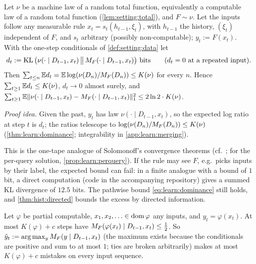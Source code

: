 \begin{theorem}[merging]\label{thm:learn:merging}
Let $\nu$ be a machine law of a random total function, equivalently a computable law of a random total function (\cref{lem:setting:total}), and $F\sim\nu$. Let the inputs follow any measurable rule $x_t=s_t(h_{t-1},\xi_t)$, with $h_{t-1}$ the history, $(\xi_t)$ independent of $F$, and $s_t$ arbitrary (possibly non-computable); $y_t:=F(x_t)$. With the one-step conditionals of \cref{def:setting:data} let
\[ d_t:=\KL\big(\nu(\cdot\mid D_{t-1},x_t)\,\big\|\,\MF(\cdot\mid D_{t-1},x_t)\big)\ \text{bits}\qquad(d_t=0\text{ at a repeated input}). \]
Then $\sum_{t\le n}\mathbb{E} d_t=\mathbb{E}\log(\nu(D_n)/M_{F}(D_n))\le K(\nu)$ for every $n$. Hence $\sum_{t\ge1}\mathbb{E} d_t\le K(\nu)$, $d_t\to0$ almost surely, and $\sum_{t\ge1}\mathbb{E}\|\nu(\cdot\mid D_{t-1},x_t)-M_{F}(\cdot\mid D_{t-1},x_t)\|_1^2\le2\ln2\cdot K(\nu)$.
\end{theorem}

\emph{Proof idea.} Given the past, $y_t$ has law $\nu(\cdot\mid D_{t-1},x_t)$, so the expected log ratio at step $t$ is $d_t$; the ratios telescope to $\log(\nu(D_n)/M_{F}(D_n))\le K(\nu)$ (\cref{thm:learn:dominance}; integrability in \cref{app:learn:merging}).

This is the one-tape analogue of Solomonoff's convergence theorems (cf.\ \citealp{solomonoff1978complexity}; for the per-query solution, \cref{prop:learn:perquery}). If the rule may see $F$, e.g.\ picks inputs by their label, the expected bound can fail: in a finite analogue with a bound of $1$ bit, a direct computation (code in the accompanying repository) gives a summed KL divergence of $12.5$ bits. The pathwise bound \eqref{eq:learn:dominance} still holds, and \cref{thm:hist:directed} bounds the excess by directed information.

\begin{corollary}\label{cor:learn:mistakes}
Let $\varphi$ be partial computable, $x_1,x_2,\ldots\in\operatorname{dom}\varphi$ any inputs, and $y_t=\varphi(x_t)$. At most $K(\varphi)+c$ steps have $M_{F}(\varphi(x_t)\mid D_{t-1},x_t)\le\frac12$. So $\hat y_t:=\arg\max_yM_{F}(y\mid D_{t-1},x_t)$ (the maximum exists because the conditionals are positive and sum to at most $1$; ties are broken arbitrarily) makes at most $K(\varphi)+c$ mistakes on every input sequence.
\end{corollary}

